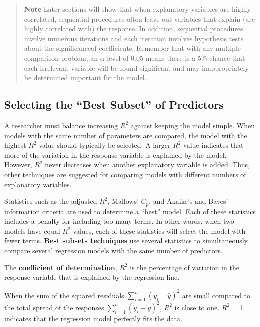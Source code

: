 \documentclass[
]{report}
\begin{document}
\begin{quote}
\textbf{Note} Later sections will show that when explanatory variables are highly correlated, sequential procedures often leave out variables that explain (are highly correlated with) the response. In addition, sequential procedures involve numerous iterations and each iteration involves hypothesis tests about the significanceof coefficients. Remember that with any multiple comparison problem, an \(\alpha\)-level of 0.05 means there is a 5\% chance that each irrelevant variable will be found significant and may inappropriately be determined important for the model.
\end{quote}

\subsection{Selecting the ``Best Subset'' of Predictors}\label{selecting-the-best-subset-of-predictors}

A researcher must balance increasing \(R^2\) against keeping the model simple. When models with the same number of parameters are compared, the model with the highest \(R^2\) value should typically be selected. A larger \(R^2\) value indicates that more of the variation in the response variable is explained by the model. However, \(R^2\) never decreases when another explanatory variable is added. Thus, other techniques are suggested for comparing models with different numbers of explanatory variables.

Statistics such as the adjusted \(R^2\), Mallows' \(C_p\), and Akaike's and Bayes' information criteria are used to determine a ``best'' model. Each of these statistics includes a penalty for including too many terms. In other words, when two models have equal \(R^2\) values, each of these statistics will select the model with fewer terms. \textbf{Best subsets techniques} use several statistics to simultaneously compare several regression models with the same number of predictors.

The \textbf{coefficient of determination}, \textbf{\(R^2\)} is the percentage of variation in the response variable that is explained by the regression line.

When the sum of the squared residuals \({\sum_{i=1}^{n}({y}_i - \hat{y})^2}\) are small compared to the total spread of the responses \({\sum_{i=1}^{n}({y}_i - \bar{y})^2}\), \(R^2\) is close to one. \(R^2\) = 1 indicates that the regression model perfectly fits the data.
\end{document}
